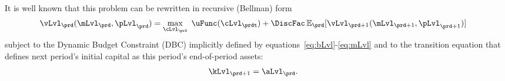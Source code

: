 It is well known that this problem can be rewritten in recursive (Bellman) form
  \begin{equation}\begin{gathered}\begin{aligned}
        {\vLvl}_{\prd}(\mLvl_{\prd},\pLvl_{\prd})  & = \max_{\cLvl_{\prd}}~ \uFunc(\cLvl_{\prdt}) + {\DiscFac}\Ex_{\prd}[ {\vLvl}_{\prd+1}({\mLvl}_{\prd+1},\pLvl_{\prd+1})]\label{eq:vrecurse}
      \end{aligned}\end{gathered}\end{equation}
subject to the Dynamic Budget Constraint (DBC) implicitly defined by equations~\eqref{eq:bLvl}-\eqref{eq:mLvl} and to the transition equation that defines next period's initial capital as this period's end-of-period assets:
\begin{equation}\begin{gathered}\begin{aligned}
      \kLvl_{\prd+1} & = \aLvl_{\prd}. \label{eq:transitionstate}
    \end{aligned}\end{gathered}\end{equation}



